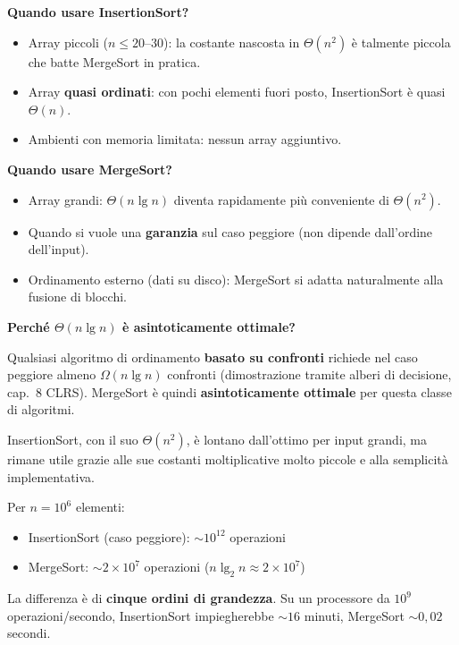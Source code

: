 \begin{softnote}
	\textbf{Quando usare InsertionSort?}
	\begin{itemize}
		\item Array piccoli ($n \leq 20\text{--}30$): la costante nascosta
		in $\Theta(n^2)$ è talmente piccola che batte MergeSort in pratica.
		\item Array \textbf{quasi ordinati}: con pochi elementi fuori posto,
		InsertionSort è quasi $\Theta(n)$.
		\item Ambienti con memoria limitata: nessun array aggiuntivo.
	\end{itemize}
	
	\textbf{Quando usare MergeSort?}
	\begin{itemize}
		\item Array grandi: $\Theta(n \lg n)$ diventa rapidamente più
		conveniente di $\Theta(n^2)$.
		\item Quando si vuole una \textbf{garanzia} sul caso peggiore
		(non dipende dall'ordine dell'input).
		\item Ordinamento esterno (dati su disco): MergeSort si adatta
		naturalmente alla fusione di blocchi.
	\end{itemize}
\end{softnote}

\begin{hardnote}
	\textbf{Perché $\Theta(n \lg n)$ è asintoticamente ottimale?}
	
	Qualsiasi algoritmo di ordinamento \textbf{basato su confronti}
	richiede nel caso peggiore almeno $\Omega(n \lg n)$ confronti
	(dimostrazione tramite alberi di decisione, cap.\ 8 CLRS).
	MergeSort è quindi \textbf{asintoticamente ottimale} per questa
	classe di algoritmi.
	
	InsertionSort, con il suo $\Theta(n^2)$, è lontano dall'ottimo
	per input grandi, ma rimane utile grazie alle sue costanti
	moltiplicative molto piccole e alla semplicità implementativa.
\end{hardnote}

\begin{esempio}
	Per $n = 10^6$ elementi:
	\begin{itemize}
		\item InsertionSort (caso peggiore): $\sim 10^{12}$ operazioni
		\item MergeSort: $\sim 2 \times 10^7$ operazioni
		($n \lg_2 n \approx 2 \times 10^7$)
	\end{itemize}
	La differenza è di \textbf{cinque ordini di grandezza}.
	Su un processore da $10^9$ operazioni/secondo, InsertionSort
	impiegherebbe $\sim 16$ minuti, MergeSort $\sim 0{,}02$ secondi.
\end{esempio}